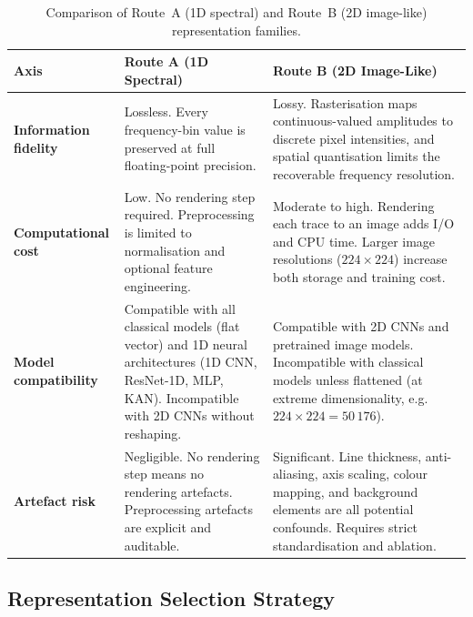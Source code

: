 \begin{table}[htbp]
    \centering
    \caption{%
        Comparison of Route~A (1D spectral) and Route~B (2D image-like)
        representation families.%
    }
    \label{tab:route_comparison}
    \begin{tabular}{p{3.0cm}p{5.2cm}p{5.2cm}}
        \toprule
        \textbf{Axis} & \textbf{Route A (1D Spectral)} &
            \textbf{Route B (2D Image-Like)} \\
        \midrule
        \textbf{Information fidelity} &
            Lossless.  Every frequency-bin value is preserved at full
            floating-point precision. &
            Lossy.  Rasterisation maps continuous-valued amplitudes to
            discrete pixel intensities, and spatial quantisation limits
            the recoverable frequency resolution. \\[6pt]
        \textbf{Computational cost} &
            Low.  No rendering step required.  Preprocessing is limited
            to normalisation and optional feature engineering. &
            Moderate to high.  Rendering each trace to an image adds
            I/O and CPU time.  Larger image resolutions
            ($224\times224$) increase both storage and training cost. \\[6pt]
        \textbf{Model compatibility} &
            Compatible with all classical models (flat vector) and 1D
            neural architectures (1D CNN, ResNet-1D, MLP, KAN).
            Incompatible with 2D CNNs without reshaping. &
            Compatible with 2D CNNs and pretrained image models.
            Incompatible with classical models unless flattened (at
            extreme dimensionality, e.g.\ $224\times224 = 50\,176$). \\[6pt]
        \textbf{Artefact risk} &
            Negligible.  No rendering step means no rendering artefacts.
            Preprocessing artefacts are explicit and auditable. &
            Significant.  Line thickness, anti-aliasing, axis scaling,
            colour mapping, and background elements are all potential
            confounds.  Requires strict standardisation and ablation. \\
        \bottomrule
    \end{tabular}
\end{table}

\subsection{Representation Selection Strategy}
\label{sec:repr:strategy}

